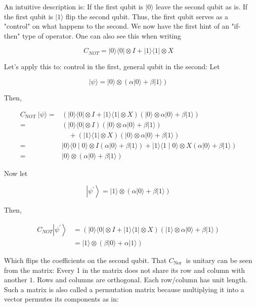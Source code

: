 \documentclass[main.tex]{subfiles}
\begin{document}
    An intuitive description is: If the first qubit is $|0\rangle$ leave the second qubit as is. If the first qubit is $|1\rangle$ flip the second qubit. Thus, the first qubit serves as a "control" on what happens to the second. We now have the first hint of an "if-then" type of operator. One can also see this when writing
    
    $$
    C_{N O T}=|0\rangle\langle 0|\otimes I+| 1\rangle\langle 1| \otimes X
    $$
    
    Let's apply this to: control in the first, general qubit in the second: Let
    
    $$
    |\psi\rangle=|0\rangle \otimes(\alpha|0\rangle+\beta|1\rangle)
    $$
    
    Then,
    
    $$
    \begin{aligned}
    C_{\text {NOT }}|\psi\rangle=&(|0\rangle\langle 0|\otimes I+| 1\rangle\langle 1| \otimes X)(|0\rangle \otimes \alpha|0\rangle+\beta|1\rangle) \\
    =&(|0\rangle\langle 0| \otimes I)(|0\rangle \otimes \alpha|0\rangle+\beta|1\rangle) \\
    & \quad+(|1\rangle\langle 1| \otimes X)(|0\rangle \otimes \alpha|0\rangle+\beta|1\rangle) \\
    =&|0\rangle\langle 0 \mid 0\rangle \otimes I(\alpha|0\rangle+\beta|1\rangle)+|1\rangle\langle 1 \mid 0\rangle \otimes X(\alpha|0\rangle+\beta|1\rangle) \\
    =&|0\rangle \otimes(\alpha|0\rangle+\beta|1\rangle)
    \end{aligned}
    $$
    
    Now let
    
    $$
    \left|\psi^{\prime}\right\rangle=|1\rangle \otimes(\alpha|0\rangle+\beta|1\rangle)
    $$
    
    Then,
    
    $$
    \begin{aligned}
    C_{N O T}\left|\psi^{\prime}\right\rangle &=(|0\rangle\langle 0|\otimes I+| 1\rangle\langle 1| \otimes X)(|1\rangle \otimes \alpha|0\rangle+\beta|1\rangle) \\
    &=|1\rangle \otimes(\beta|0\rangle+\alpha|1\rangle)
    \end{aligned}
    $$
    
    Which flips the coefficients on the second qubit. That $C_{\text {Nor }}$ is unitary can be seen from the matrix: Every 1 in the matrix does not share its row and column with another $1$. Rows and columns are orthogonal. Each row/column has unit length. Such a matrix is also called a permutation matrix because multiplying it into a vector permutes its components as in:
    
\end{document}
